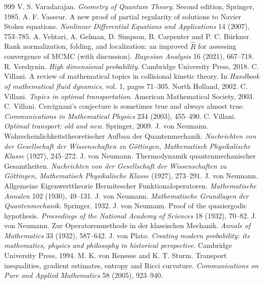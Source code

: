 \begin{thebibliography}{999}
 V. S. Varadarajan. \emph{Geometry of Quantum Theory}. Second edition, Springer, 1985.
 A. F. Vasseur. A new proof of partial regularity of solutions to Navier Stokes equations. \emph{Nonlinear Differential Equations and Applications} 14 (2007), 753--785.
 A. Vehtari, A. Gelman, D. Simpson, B. Carpenter and P. C. B\"urkner. Rank normalization, folding, and localization: an improved $\widehat R$ for assessing convergence of MCMC (with discussion). \emph{Bayesian Analysis} 16 (2021), 667--718.
 R. Vershynin. \emph{High dimensional probability}. Cambridge University Press, 2018.
 C. Villani. A review of mathematical topics in collisional kinetic theory. In \emph{Handbook of mathematical fluid dynamics}, vol. 1, pages 71--305. North Holland, 2002.
 C. Villani. \emph{Topics in optimal transportation}. American Mathematical Society, 2003.
 C. Villani. Cercignani's conjecture is sometimes true and always almost true. \emph{Communications in Mathematical Physics} 234 (2003), 455--490.
 C. Villani. \emph{Optimal transport: old and new}. Springer, 2009.
 J. von Neumann. Wahrscheinlichkeitstheoretischer Aufbau der Quantenmechanik. \emph{Nachrichten von der Gesellschaft der Wissenschaften zu G\"ottingen, Mathematisch Physikalische Klasse} (1927), 245--272.
 J. von Neumann. Thermodynamik quantenmechanischer Gesamtheiten. \emph{Nachrichten von der Gesellschaft der Wissenschaften zu G\"ottingen, Mathematisch Physikalische Klasse} (1927), 273--291.
 J. von Neumann. Allgemeine Eigenwerttheorie Hermitescher Funktionaloperatoren. \emph{Mathematische Annalen} 102 (1930), 49--131.
 J. von Neumann. \emph{Mathematische Grundlagen der Quantenmechanik}. Springer, 1932.
 J. von Neumann. Proof of the quasiergodic hypothesis. \emph{Proceedings of the National Academy of Sciences} 18 (1932), 70--82.
 J. von Neumann. Zur Operatorenmethode in der klassischen Mechanik. \emph{Annals of Mathematics} 33 (1932), 587--642.
 J. von Plato. \emph{Creating modern probability: its mathematics, physics and philosophy in historical perspective}. Cambridge University Press, 1994.
 M. K. von Renesse and K. T. Sturm. Transport inequalities, gradient estimates, entropy and Ricci curvature. \emph{Communications on Pure and Applied Mathematics} 58 (2005), 923--940.

\end{thebibliography}
